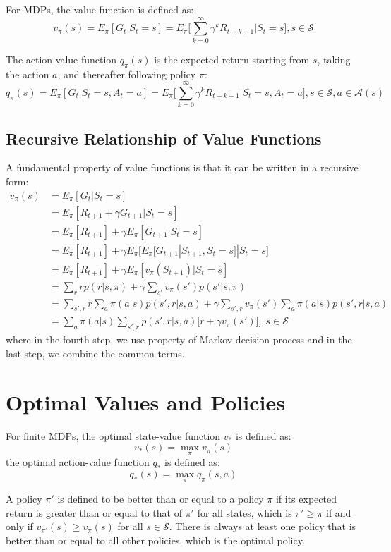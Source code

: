 \documentclass[twoside]{article}
\begin{document}
 For MDPs, the value function is defined as: 
$$
v_\pi(s) = E_\pi[G_t|S_t=s] = E_\pi\Big[\sum_{k=0}^{\infty}\gamma^k R_{t+k+1}\Big|S_t=s\Big], s\in\mathcal{S}
$$

The action-value function $q_\pi(s)$ is the expected return starting from $s$, taking the action $a$, and thereafter following policy $\pi$:
$$
q_\pi(s) = E_\pi[G_t|S_t=s, A_t=a] = E_\pi\Big[\sum_{k=0}^{\infty}\gamma^k R_{t+k+1}\Big|S_t=s, A_t=a \Big], s\in\mathcal{S}, a \in \mathcal{A}(s)
$$

\subsection{Recursive Relationship of Value Functions}

A fundamental property of value functions is that it can be written in a recursive form:
\begin{align*}
v_\pi(s) &= E_\pi[G_t|S_t=s] \\
&=  E_\pi[R_{t+1} + \gamma G_{t+1}|S_t=s] \\
&= E_\pi[R_{t+1}] + \gamma E_\pi[G_{t+1}|S_t=s]\\
&= E_\pi[R_{t+1}] + \gamma E_\pi\big[ E_\pi[G_{t+1}|S_{t+1}, S_t=s]|S_t=s \big]\\
&= E_\pi[R_{t+1}] + \gamma E_\pi[v_\pi(S_{t+1})|S_t=s]\\
&= \sum_r rp(r|s,\pi) + \gamma\sum_{s'}v_\pi(s')p(s'|s,\pi)\\
&= \sum_{s',r}r\sum_a\pi(a|s)p(s',r|s,a) + \gamma\sum_{s',r}v_\pi(s')\sum_a\pi(a|s)p(s',r|s,a)\\
&= \sum_a \pi(a|s)\sum_{s',r}p(s', r| s,a)\Big[r+\gamma v_\pi(s')] \Big], s \in \mathcal{S}
\end{align*}
where in the fourth step, we use property of Markov decision process and in the last step, we combine the common terms.
\section{Optimal Values and Policies}

For finite MDPs, the optimal state-value function $v_*$ is defined as:
$$
v_*(s) = \max_\pi v_\pi(s)
$$
the optimal action-value function $q_*$ is defined as:
$$
q_*(s) = \max_\pi q_\pi(s, a)
$$

A policy $\pi'$ is defined to be better than or equal to a policy $\pi$ if its expected return is greater than or equal to that of $\pi'$ for all states, which is $\pi' \ge \pi$ if and only if $v_{\pi'}(s) \ge v_\pi(s)$ for all $s \in \mathcal{S}$. There is always at least one policy that is better than or equal to all other policies, which is the optimal policy.
\end{document}

